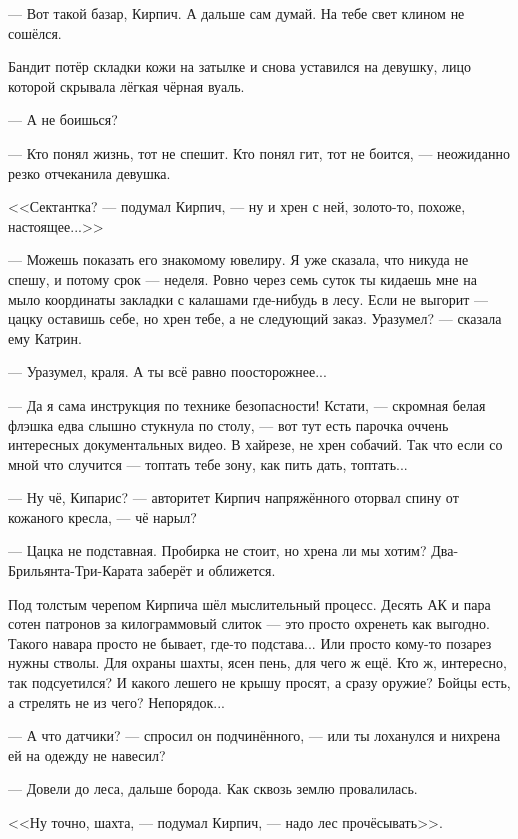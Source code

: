 


--- Вот такой базар, Кирпич. А дальше сам думай. На тебе свет клином не сошёлся.

Бандит потёр складки кожи на затылке и снова уставился на девушку, лицо которой скрывала лёгкая чёрная вуаль.

--- А не боишься?

--- Кто понял жизнь, тот не спешит. Кто понял гит, тот не боится, --- неожиданно резко отчеканила девушка.

<<Сектантка? --- подумал Кирпич, --- ну и хрен с ней, золото-то, похоже, настоящее...>>

--- Можешь показать его знакомому ювелиру. Я уже сказала, что никуда не спешу, и потому срок --- неделя.
Ровно через семь суток ты кидаешь мне на мыло координаты закладки с калашами где-нибудь в лесу.
Если не выгорит --- цацку оставишь себе, но хрен тебе, а не следующий заказ. Уразумел? --- сказала ему Катрин.

--- Уразумел, краля. А ты всё равно поосторожнее...

--- Да я сама инструкция по технике безопасности! Кстати, --- скромная белая флэшка едва слышно стукнула по столу,
--- вот тут есть парочка оччень интересных документальных видео. В хайрезе, не хрен собачий.
Так что если со мной что случится --- топтать тебе зону, как пить дать, топтать...

\emptypar

--- Ну чё, Кипарис? --- авторитет Кирпич напряжённого оторвал спину от кожаного кресла, --- чё нарыл?

--- Цацка не подставная. Пробирка не стоит, но хрена ли мы хотим? Два-Брильянта-Три-Карата заберёт и оближется.

Под толстым черепом Кирпича шёл мыслительный процесс. Десять АК и пара сотен патронов за килограммовый слиток ---
это просто охренеть как выгодно. Такого навара просто не бывает, где-то подстава... Или просто кому-то позарез нужны стволы.
Для охраны шахты, ясен пень, для чего ж ещё. Кто ж, интересно, так подсуетился?
И какого лешего не крышу просят, а сразу оружие? Бойцы есть, а стрелять не из чего? Непорядок...

--- А что датчики? --- спросил он подчинённого, --- или ты лоханулся и нихрена ей на одежду не навесил?

--- Довели до леса, дальше борода. Как сквозь землю провалилась.

<<Ну точно, шахта, --- подумал Кирпич, --- надо лес прочёсывать>>.

\emptypar


